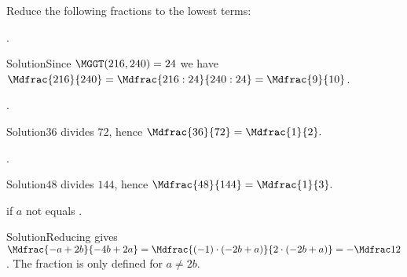 \begin{MExercises}

\begin{MExercise}
Reduce the following fractions to the lowest terms:

\begin{MExerciseItems}
\item{. \begin{MHint}{Solution}Since $\MGGT(216,240)=24$ we have $\displaystyle\Mdfrac{216}{240}=\Mdfrac{216:24}{240:24}=\Mdfrac{9}{10}$.\end{MHint}}
\item{. \begin{MHint}{Solution}$36$ divides $72$, hence $\Mdfrac{36}{72}=\Mdfrac{1}{2}.$\end{MHint}} 
\item{. \begin{MHint}{Solution}$48$ divides $144$, hence $\Mdfrac{48}{144}=\Mdfrac{1}{3}.$\end{MHint}}
\item{ if $a$ not equals . \begin{MHint}{Solution}Reducing gives $\Mdfrac{-a+2b}{-4b+2a}=\Mdfrac{(-1)\cdot (-2b+a)}{2\cdot (-2b+a)}=-\Mdfrac12$. The fraction is only defined for $a\not=2b$.\end{MHint}} 
\end{MExerciseItems}
\end{MExercise}


\end{MExercises}
